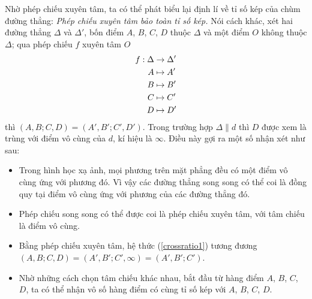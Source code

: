         Nhờ phép chiếu xuyên tâm, ta có thể phát biểu lại định lí về tỉ số kép của chùm đường thẳng: \textit{Phép chiếu xuyên tâm bảo toàn tỉ số kép.} Nói cách khác, xét hai đường thẳng \(\Delta\) và \(\Delta'\), bốn điểm \(A\), \(B\), \(C\), \(D\) thuộc \(\Delta\) và một điểm \(O\) không thuộc \(\Delta\); qua phép chiếu \(f\) xuyên tâm \(O\)
        \begin{equation}
            \begin{aligned}
                f: \Delta & \to \Delta' \\
                A & \mapsto A' \\
                B & \mapsto B' \\
                C & \mapsto C' \\
                D & \mapsto D'
            \end{aligned}
            \notag
        \end{equation}
        thì \((A,B;C,D) = (A',B';C',D')\). Trong trường hợp \(\Delta \parallel d\) thì \(D\) được xem là trùng với điểm vô cùng của \(d\), kí hiệu là \(\infty\). Điều này gợi ra một số nhận xét như sau:
        \begin{itemize}
            \item Trong hình học xạ ảnh, mọi phương trên mặt phẳng đều có một điểm vô cùng ứng với phương đó. Vì vậy các đường thẳng song song có thể coi là đồng quy tại điểm vô cùng ứng với phương của các đường thẳng đó.
            \item Phép chiếu song song có thể được coi là phép chiếu xuyên tâm, với tâm chiếu là điểm vô cùng.
            \item Bằng phép chiếu xuyên tâm, hệ thức (\ref{crossratio1}) tương đương \((A,B;C,D) = (A',B';C',\infty) = (A',B';C')\).
            \item Nhờ những cách chọn tâm chiếu khác nhau, bắt đầu từ hàng điểm \(A\), \(B\), \(C\), \(D\), ta có thể nhận vô số hàng điểm có cùng tỉ số kép với \(A\), \(B\), \(C\), \(D\).
        \end{itemize}

